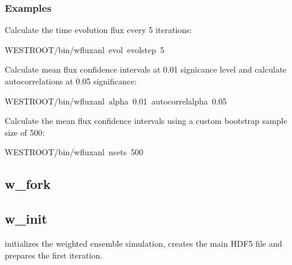 \documentclass[letterpaper,10pt,english]{sphinxmanual}
\begin{document}
\subsubsection{Examples}
\label{\detokenize{users_guide/command_line_tools/w_fluxanl:examples}}
Calculate the time evolution flux every 5 iterations:

\begin{sphinxVerbatim}[commandchars=\\\{\}]
\PYGZdl{}WEST\PYGZus{}ROOT/bin/w\PYGZus{}fluxanl \PYGZhy{}\PYGZhy{}evol \PYGZhy{}\PYGZhy{}evol\PYGZhy{}step 5
\end{sphinxVerbatim}

Calculate mean flux confidence intervals at 0.01 signicance level and
calculate autocorrelations at 0.05 significance:

\begin{sphinxVerbatim}[commandchars=\\\{\}]
\PYGZdl{}WEST\PYGZus{}ROOT/bin/w\PYGZus{}fluxanl \PYGZhy{}\PYGZhy{}alpha 0.01 \PYGZhy{}\PYGZhy{}autocorrel\PYGZhy{}alpha 0.05
\end{sphinxVerbatim}

Calculate the mean flux confidence intervals using a custom bootstrap
sample size of 500:

\begin{sphinxVerbatim}[commandchars=\\\{\}]
\PYGZdl{}WEST\PYGZus{}ROOT/bin/w\PYGZus{}fluxanl \PYGZhy{}\PYGZhy{}n\PYGZhy{}sets 500
\end{sphinxVerbatim}


\subsection{w\_fork}
\label{\detokenize{users_guide/command_line_tools/w_fork:w-fork}}\label{\detokenize{users_guide/command_line_tools/w_fork:id1}}\label{\detokenize{users_guide/command_line_tools/w_fork::doc}}

\subsection{w\_init}
\label{\detokenize{users_guide/command_line_tools/w_init:w-init}}\label{\detokenize{users_guide/command_line_tools/w_init:id1}}\label{\detokenize{users_guide/command_line_tools/w_init::doc}}
 initializes the weighted ensemble simulation, creates the
main HDF5 file and prepares the first iteration.
\end{document}
